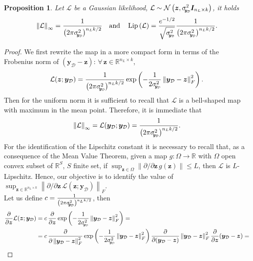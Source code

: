 \documentclass[a4paper, 11pt, reqno]{amsart}
\theoremstyle{plain}
\newtheorem{proposition}[theorem]{Proposition}
\theoremstyle{remark}
\theoremstyle{definition}
\newcommand{\normal}[2]{\mathcal{N}\left(#1, #2\right)}
\newcommand{\real}{\mathbb{R}}
\newcommand{\norm}[1]{\left\lVert#1\right\rVert}
\newcommand{\lipschitz}[1]{\operatorname{Lip}\left(#1\right)}
\renewcommand{\exp}[1]{\operatorname{exp}\left(#1\right)}
\let\oldforall\forall
\renewcommand{\forall}{\oldforall\,}
\newcommand{\setmuskip}[1]{%
    \thinmuskip = #1\thinmuskip
    \medmuskip = #1\thinmuskip
    \thickmuskip = #1\thinmuskip}
\newcommand{\sigmay}{\sigma_{\scalebox{0.65}{$\kern-3pt\bm{y}_{\mathcal{D}}$}}}%
\begin{document}
\begin{proposition} \label{prop:likelihood}
	Let $\mathcal{L}$ be a Gaussian likelihood, $\mathcal{L} \sim \normal{\bm{z}}{\sigmay^2 \bm{I}_{n_L \times k}}$, it holds
	\begin{equation*}
		\norm{\mathcal{L}}_{\infty} = \frac{1}{\left(2 \pi \sigmay^2\right)^{n_L k / 2}} \quad \text{and} \quad \lipschitz{\mathcal{L}} = \frac{e^{-1/2}}{\sqrt{\sigmay^2}} \frac{1}{\left(2 \pi \sigmay^2\right)^{n_L k / 2}}.
	\end{equation*}
\end{proposition}
\begin{proof}
	We first rewrite the map in a more compact form in terms of the Frobenius norm of $(\bm{y}_{\mathcal{D}} - \bm{z})$: $\forall \bm{z} \in \real^{n_L \times k}$,
	\begin{equation*}
		\mathcal{L}(\bm{z}; \bm{y}_{\mathcal{D}}) = \frac{1}{\left(2 \pi \sigmay^2\right)^{n_L k / 2}} \exp{-\frac{1}{2\sigmay^2} \norm{\bm{y}_{\mathcal{D}} - \bm{z}}_F^2}.
	\end{equation*}
	Then for the uniform norm it is sufficient to recall that $\mathcal{L}$ is a bell-shaped map with maximum in the mean point. 
	Therefore, it is immediate that
	\begin{equation*}
		\norm{\mathcal{L}}_{\infty} = \mathcal{L}(\bm{y}_{\mathcal{D}}; \bm{y}_{\mathcal{D}}) = \frac{1}{\left(2 \pi \sigmay^2\right)^{n_L k / 2}}.
	\end{equation*}
	For the identification of the Lipschitz constant it is necessary to recall that, as a consequence of the Mean Value Theorem, given a map $g: \Omega \to \real$ with $\Omega$ open convex subset of $\real^S$, $S$ finite set, if $\sup_{\bm{z} \in \Omega} \norm{\partial / \partial \bm{z} \, g(\bm{z})} \leq L$, then $\mathcal{L}$ is $L$-Lipschitz.
	Hence, our objective is to identify the value of $\sup_{\bm{z} \in \real^{n_L \times k}} \norm{\partial / \partial \bm{z} \, \mathcal{L}(\bm{z}; \bm{y}_{\mathcal{D}})}_F$. \\
	Let us define $c = \frac{1}{\left(2 \pi \sigmay^2\right)^{n_L k / 2}}$, then
	\begin{equation*}
		\begin{aligned}
			\frac{\partial}{\partial \bm{z}} \mathcal{L}(\bm{z}; \bm{y}_{\mathcal{D}}) & = c \, \frac{\partial}{\partial \bm{z}} \exp{-\frac{1}{2\sigmay^2} \norm{\bm{y}_{\mathcal{D}} - \bm{z}}_F^2} = \\
			& = c \, \frac{\partial}{\partial \norm{\bm{y}_{\mathcal{D}} - \bm{z}}_F^2} \exp{-\frac{1}{2\sigmay^2} \norm{\bm{y}_{\mathcal{D}} - \bm{z}}_F^2} \frac{\partial}{\partial (\bm{y}_{\mathcal{D}} - \bm{z})} \norm{\bm{y}_{\mathcal{D}} - \bm{z}}_F^2 \frac{\partial}{\partial \bm{z}} (\bm{y}_{\mathcal{D}} - \bm{z}) = \\

\end{aligned}
\end{equation*}
\end{proof}
\end{document}
